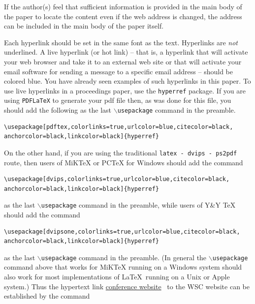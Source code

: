 \documentclass{wscpaperproc}
\theoremstyle{wsc}
\begin{document}
If the author(s) feel that sufficient information is provided in the main body of the paper to locate the content even if the web address is changed, the address can be included in the main body of the paper itself.

Each hyperlink should be set in the same font as the text.
Hyperlinks are {\em not} underlined.
A live hyperlink (or hot link) -- that is, a hyperlink that will activate your web browser and take it to an external web site or that will activate your email software for sending a message to a specific email address -- should be colored blue. You have already seen examples of such hyperlinks in this paper.
To use live hyperlinks in a proceedings paper, use the {\tt hyperref} package. If you are using {\tt PDFLaTeX} to generate your pdf file then, as
was done for this file, you should add the following as the last {\tt $\backslash$usepackage} command in the preamble.\newline


\begin{verbatim}
\usepackage[pdftex,colorlinks=true,urlcolor=blue,citecolor=black,
anchorcolor=black,linkcolor=black]{hyperref}
\end{verbatim}\vspace{5 mm}

\noindent On the other hand, if you are using the traditional {\tt latex - dvips - ps2pdf} route, then users of MiKTeX or PCTeX for Windows should add the command\newline


\begin{verbatim}
\usepackage[dvips,colorlinks=true,urlcolor=blue,citecolor=black,
anchorcolor=black,linkcolor=black]{hyperref}
\end{verbatim}\vspace{5 mm}


\noindent as the last {\tt $\backslash$usepackage} command in the preamble, while users of Y\&Y TeX should add the command\newline


\begin{verbatim}
\usepackage[dvipsone,colorlinks=true,urlcolor=blue,citecolor=black,
anchorcolor=black,linkcolor=black]{hyperref}
\end{verbatim}\vspace{5 mm}


\noindent as the last {\tt $\backslash$usepackage} command in the preamble.
(In general the {\tt $\backslash$usepackage} command above that works for MiKTeX running on a Windows system should also work for most implementations of \LaTeX\ running on a Unix or Apple system.)
Thus the hypertext link \href{http://www.wintersim.org}{conference website}~\cite{WSC} to the WSC website can be established by the command\newline
\end{document}
